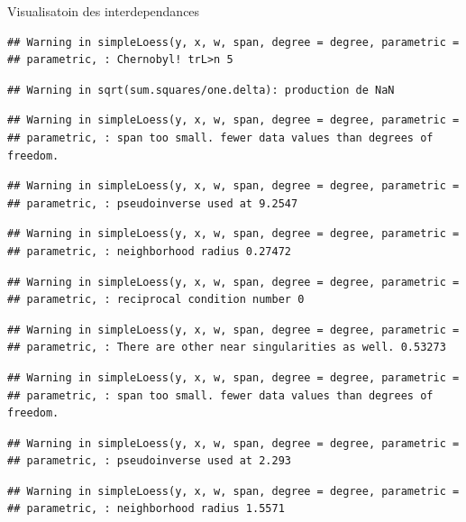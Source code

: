 \documentclass[11pt,ignorenonframetext,]{beamer}
\begin{document}
\begin{frame}[fragile]{Visualisatoin des interdependances}
\begin{verbatim}
## Warning in simpleLoess(y, x, w, span, degree = degree, parametric =
## parametric, : Chernobyl! trL>n 5
\end{verbatim}

\begin{verbatim}
## Warning in sqrt(sum.squares/one.delta): production de NaN
\end{verbatim}

\begin{verbatim}
## Warning in simpleLoess(y, x, w, span, degree = degree, parametric =
## parametric, : span too small. fewer data values than degrees of freedom.
\end{verbatim}

\begin{verbatim}
## Warning in simpleLoess(y, x, w, span, degree = degree, parametric =
## parametric, : pseudoinverse used at 9.2547
\end{verbatim}

\begin{verbatim}
## Warning in simpleLoess(y, x, w, span, degree = degree, parametric =
## parametric, : neighborhood radius 0.27472
\end{verbatim}

\begin{verbatim}
## Warning in simpleLoess(y, x, w, span, degree = degree, parametric =
## parametric, : reciprocal condition number 0
\end{verbatim}

\begin{verbatim}
## Warning in simpleLoess(y, x, w, span, degree = degree, parametric =
## parametric, : There are other near singularities as well. 0.53273
\end{verbatim}

\begin{verbatim}
## Warning in simpleLoess(y, x, w, span, degree = degree, parametric =
## parametric, : span too small. fewer data values than degrees of freedom.
\end{verbatim}

\begin{verbatim}
## Warning in simpleLoess(y, x, w, span, degree = degree, parametric =
## parametric, : pseudoinverse used at 2.293
\end{verbatim}

\begin{verbatim}
## Warning in simpleLoess(y, x, w, span, degree = degree, parametric =
## parametric, : neighborhood radius 1.5571
\end{verbatim}


\end{frame}
\end{document}
